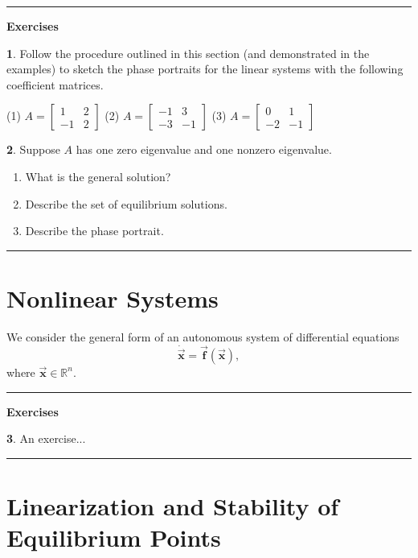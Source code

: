 \documentclass[reqno]{immbook}
\newcommand{\Real}{\mathbb{R}}
\newcommand{\BF}{\vec{\textbf{f}}}
\newcommand{\BX}{\vec{\textbf{x}}}
\newcommand{\ds}{\displaystyle}
\numberwithin{equation}{chapter}
\numberwithin{question}{section}
\numberwithin{theorem}{chapter}
\numberwithin{figure}{chapter}
\theoremstyle{definition}
\newtheorem{exercise}{}[section]
\newenvironment{exercises}%
{%
\medskip\hrule\medskip\noindent\textbf{Exercises}%
}%
{%
\medskip\hrule
}
\begin{document}
\begin{exercises}
\begin{exercise}
Follow the procedure outlined in this section (and demonstrated
in the examples) to sketch the phase portraits for the linear
systems with the following coefficient matrices.

\smallskip
(1) $\ds A = \begin{bmatrix} 1 & 2 \\ -1 & 2 \end{bmatrix}$
\hspace{1cm}
(2) $\ds A = \begin{bmatrix} -1 & 3 \\ -3 & -1 \end{bmatrix}$
\hspace{1cm}
(3) $\ds A = \begin{bmatrix} 0 & 1 \\ -2 & -1 \end{bmatrix}$ 
\end{exercise}
\begin{exercise}
Suppose $A$ has one zero eigenvalue and one nonzero eigenvalue.
\begin{enumerate}
\item What is the general solution?
\item Describe the set of equilibrium solutions.
\item Describe the phase portrait.
\end{enumerate}
\end{exercise}
\end{exercises}
%
%
\section{Nonlinear Systems}
We consider the general form of an autonomous
system of differential equations
\begin{equation}
   \dot{\BX} = \BF\left(\BX\right),
   \label{eqn:NONLIN}
\end{equation}
where $\BX \in \Real^{n}$.

\begin{exercises}
\begin{exercise}
An exercise...
\end{exercise}
\end{exercises}

\newpage

\section{Linearization and Stability of Equilibrium Points}
\label{sec:DELinearization}
\end{document}
